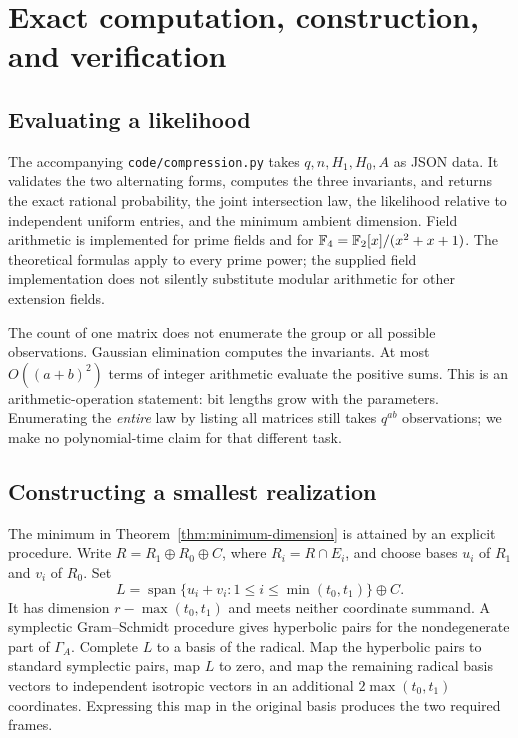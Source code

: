 \section{Exact computation, construction, and verification}
\label{sec:computation}

\subsection{Evaluating a likelihood}

The accompanying \texttt{code/compression.py} takes $q,n,H_1,H_0,A$ as JSON data. It validates the two alternating forms, computes the three invariants, and returns the exact rational probability, the joint intersection law, the likelihood relative to independent uniform entries, and the minimum ambient dimension. Field arithmetic is implemented for prime fields and for $\mathbb F_4=\mathbb F_2[x]/(x^2+x+1)$. The theoretical formulas apply to every prime power; the supplied field implementation does not silently substitute modular arithmetic for other extension fields.

The count of one matrix does not enumerate the group or all possible observations. Gaussian elimination computes the invariants. At most $O((a+b)^2)$ terms of integer arithmetic evaluate the positive sums. This is an arithmetic-operation statement: bit lengths grow with the parameters. Enumerating the \emph{entire} law by listing all matrices still takes $q^{ab}$ observations; we make no polynomial-time claim for that different task.

\subsection{Constructing a smallest realization}

The minimum in Theorem~\ref{thm:minimum-dimension} is attained by an explicit procedure. Write
$R=R_1\oplus R_0\oplus C$, where $R_i=R\cap E_i$, and choose bases $u_i$ of $R_1$ and $v_i$ of $R_0$. Set
\[
 L=\operatorname{span}\{u_i+v_i:1\le i\le\min(t_0,t_1)\}\oplus C.
\]
It has dimension $r-\max(t_0,t_1)$ and meets neither coordinate summand. A symplectic Gram--Schmidt procedure gives hyperbolic pairs for the nondegenerate part of $\Gamma_A$. Complete $L$ to a basis of the radical. Map the hyperbolic pairs to standard symplectic pairs, map $L$ to zero, and map the remaining radical basis vectors to independent isotropic vectors in an additional $2\max(t_0,t_1)$ coordinates. Expressing this map in the original basis produces the two required frames.

